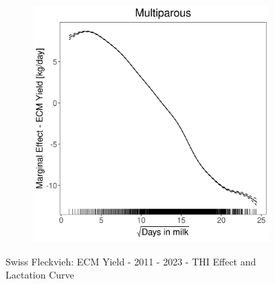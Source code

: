 \begin{figure}[H]
\begin{subfigure}[b]{0.45\textwidth}
    \end{subfigure}
    \hspace{0.05\textwidth} %
    \begin{subfigure}[b]{0.45\textwidth}
        \centering
        \includegraphics[width=\textwidth]{thesis/figures/models/ecm/after2010/sf_ecm_after2010/sf_ecm_after2010_marginal_dim_milk_multi.png}
    \end{subfigure}
    \caption[]{Swiss Fleckvieh: ECM Yield - 2011 - 2023 - THI Effect and Lactation Curve}
    \label{fig:main}
\end{figure}

